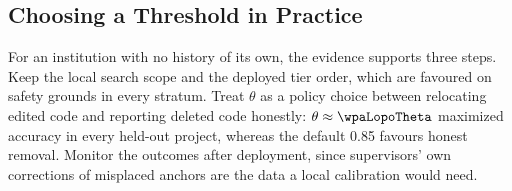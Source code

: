 \subsection{Choosing a Threshold in Practice}
For an institution with no history of its own, the evidence supports three steps. Keep the local search scope and the deployed tier order, which are favoured on safety grounds in every stratum. Treat $\theta$ as a policy choice between relocating edited code and reporting deleted code honestly: $\theta\approx\wpaLopoTheta$ maximized accuracy in every held-out project, whereas the default 0.85 favours honest removal. Monitor the outcomes after deployment, since supervisors' own corrections of misplaced anchors are the data a local calibration would need.
